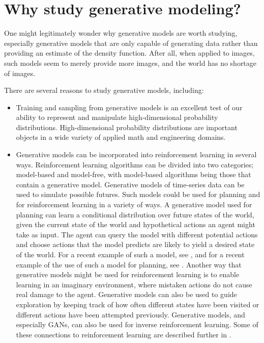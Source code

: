 \section{Why study generative modeling?}
\label{sec:why}

One might legitimately wonder why generative models are worth studying,
especially generative models that are only capable of generating data
rather than providing an estimate of the density function.
After all, when applied to images, such models seem to merely provide
more images, and the world has no shortage of images.

There are several reasons to study generative models, including:
\begin{itemize}

\item Training and sampling from generative models is an excellent test
of our ability to represent and manipulate high-dimensional probability
distributions.
High-dimensional probability distributions are important objects in a
wide variety of applied math and engineering domains.

\item Generative models can be incorporated into reinforcement learning in several
  ways.
  Reinforcement learning algorithms can be divided into two categories;
  model-based and model-free, with model-based algorithms being those that
  contain a generative model.
  Generative models of time-series data can be used to simulate possible
futures. Such models could be used for planning and for reinforcement learning
in a variety of ways.
A generative model used for planning can learn a conditional distribution over
future states of the world, given the current state of the world and hypothetical
actions an agent might take as input.
The agent can query the model with different potential actions and choose actions
that the model predicts are likely to yield a desired state of the world.
For a recent example of such a model, see \citet{finn2016unsupervised},
and for a recent example of the use of such a model for planning,
see \citet{finn2016deep}. 
Another way that generative models might be used for reinforcement learning is
to enable learning in an imaginary environment, where mistaken actions do not
cause real damage to the agent.
Generative models can also be used to guide exploration by keeping track of
how often different states have been visited or different actions have been
attempted previously.
Generative models, and especially GANs, can also be used for inverse reinforcement
learning.
Some of these connections to reinforcement learning are described further in
.


\end{itemize}
